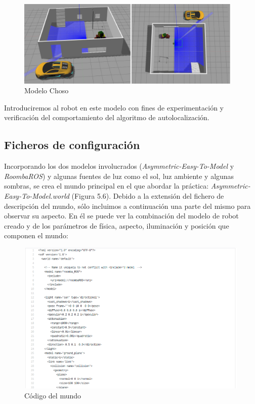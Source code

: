 \begin{figure}[H]
  \begin{center}
    \includegraphics[width=0.96\textwidth]{figures/chosoworld.png}
		\caption{Modelo Choso}
		\label{fig.choso}
		\end{center}
\end{figure}

Introduciremos al robot en este modelo con fines de experimentación y verificación del comportamiento del algoritmo de autolocalización.

\subsection{Ficheros de configuración}
Incorporando los dos modelos involucrados (\textit{Asymmetric-Easy-To-Model} y \textit{RoombaROS}) y algunas fuentes de luz como el sol, luz ambiente y algunas sombras, se crea el mundo principal en el que abordar la práctica: \textit{Asymmetric-Easy-To-Model.world} (Figura 5.6). Debido a la extensión del fichero de descripción del mundo, sólo incluimos a continuación una parte del mismo para observar su aspecto. En él se puede ver la combinación del modelo de robot creado y de los parámetros de física, aspecto, iluminación y posición que componen el mundo:

\begin{figure}[H]
  \begin{center}
    \includegraphics[width=0.99\textwidth]{figures/codeworld.png}
		\caption{Código del mundo}
		\label{fig.codeworld}
		\end{center}
\end{figure}

